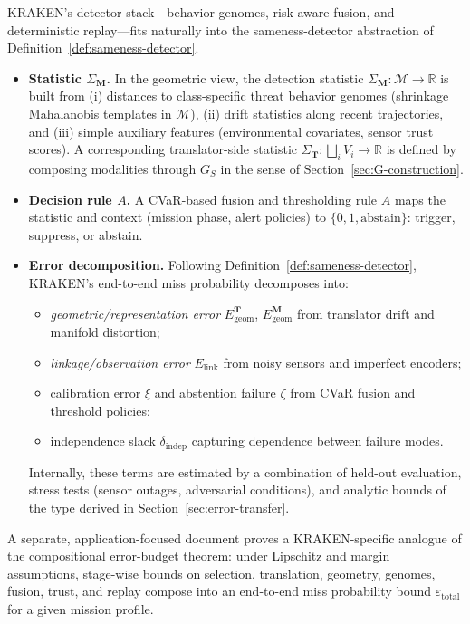 \documentclass[11pt]{article}
\begin{document}
KRAKEN’s detector stack---behavior genomes, risk-aware fusion, and deterministic
replay---fits naturally into the sameness-detector abstraction of
Definition~\ref{def:sameness-detector}.

\begin{itemize}
  \item \textbf{Statistic $\Sigma_{\mathbf{M}}$.} In the geometric view, the
  detection statistic $\Sigma_{\mathbf{M}} : \mathcal{M} \to \mathbb{R}$ is
  built from (i) distances to class-specific threat behavior genomes (shrinkage
  Mahalanobis templates in $\mathcal{M}$), (ii) drift statistics along recent
  trajectories, and (iii) simple auxiliary features (environmental covariates,
  sensor trust scores). A corresponding translator-side statistic
  $\Sigma_{\mathbf{T}} : \bigsqcup_i V_i \to \mathbb{R}$ is defined by composing
  modalities through $G_S$ in the sense of Section~\ref{sec:G-construction}.

  \item \textbf{Decision rule $A$.} A CVaR-based fusion and thresholding rule
  $A$ maps the statistic and context (mission phase, alert policies) to
  $\{0,1,\mathrm{abstain}\}$: trigger, suppress, or abstain.

  \item \textbf{Error decomposition.} Following Definition~\ref{def:sameness-detector},
  KRAKEN’s end-to-end miss probability decomposes into:
  \begin{itemize}
    \item \emph{geometric/representation error} $E_{\mathrm{geom}}^{\mathbf{T}}$,
          $E_{\mathrm{geom}}^{\mathbf{M}}$ from translator drift and manifold
          distortion;
    \item \emph{linkage/observation error} $E_{\mathrm{link}}$ from noisy sensors
          and imperfect encoders;
    \item calibration error $\xi$ and abstention failure $\zeta$ from CVaR fusion
          and threshold policies;
    \item independence slack $\delta_{\mathrm{indep}}$ capturing dependence between
          failure modes.
  \end{itemize}
  Internally, these terms are estimated by a combination of held-out evaluation,
  stress tests (sensor outages, adversarial conditions), and analytic bounds of
  the type derived in Section~\ref{sec:error-transfer}.
\end{itemize}

A separate, application-focused document proves a KRAKEN-specific analogue of
the compositional error-budget theorem: under Lipschitz and margin assumptions,
stage-wise bounds on selection, translation, geometry, genomes, fusion, trust,
and replay compose into an end-to-end miss probability bound
$\varepsilon_{\mathrm{total}}$ for a given mission profile.
\end{document}
